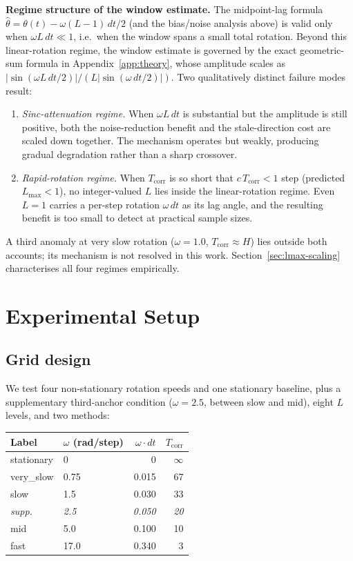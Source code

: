 \documentclass[sigconf,anonymous]{aamas}
\newcommand{\Lmax}{L_{\max}}
\newcommand{\Tcorr}{T_{\mathrm{corr}}}
\newcommand{\omdt}{\omega\!\cdot\!dt}
\begin{document}
\medskip
\noindent\textbf{Regime structure of the window estimate.}
The midpoint-lag formula $\hat\theta = \theta(t) - \omega(L{-}1)\,dt/2$
(and the bias/noise analysis above) is valid only when
$\omega L\,dt \ll 1$, i.e.\ when the window spans a small total
rotation.  Beyond this linear-rotation regime, the window estimate
is governed by the exact geometric-sum formula in
Appendix~\ref{app:theory}, whose amplitude scales as
$|\sin(\omega L\,dt/2)|/(L|\sin(\omega\,dt/2)|)$.  Two
qualitatively distinct failure modes result:
\begin{enumerate}
  \item \emph{Sinc-attenuation regime.}  When $\omega L\,dt$ is
  substantial but the amplitude is still positive,
  both the noise-reduction benefit and the stale-direction cost
  are scaled down together.  The mechanism operates but weakly,
  producing gradual degradation rather than a sharp crossover.
  \item \emph{Rapid-rotation regime.}  When $\Tcorr$ is so short
  that $c\,\Tcorr < 1$ step (predicted $\Lmax < 1$), no
  integer-valued $L$ lies inside the linear-rotation regime.
  Even $L{=}1$ carries a per-step rotation $\omega\,dt$ as its
  lag angle, and the resulting benefit is too small to detect at
  practical sample sizes.
\end{enumerate}
A third anomaly at very slow rotation ($\omega{=}1.0$,
$\Tcorr{\approx}H$) lies outside both accounts; its mechanism
is not resolved in this work.  Section~\ref{sec:lmax-scaling}
characterises all four regimes empirically.

\section{Experimental Setup}
\label{sec:setup}

\subsection{Grid design}

We test four non-stationary rotation speeds and one stationary
baseline, plus a supplementary third-anchor condition ($\omega{=}2.5$,
between slow and mid), eight $L$ levels, and two methods:

\smallskip
\begin{center}
\setlength\tabcolsep{4pt}
\begin{tabular}{llrr}
\toprule
Label & $\omega$ (rad/step) & $\omdt$ & $\Tcorr$ \\
\midrule
stationary & 0    & 0     & $\infty$ \\
very\_slow & 0.75 & 0.015 & 67       \\
slow       & 1.5  & 0.030 & 33       \\
\textit{supp.} & \textit{2.5}  & \textit{0.050} & \textit{20} \\
mid        & 5.0  & 0.100 & 10       \\
fast       & 17.0 & 0.340 & 3        \\
\bottomrule
\end{tabular}
\end{center}
\end{document}
